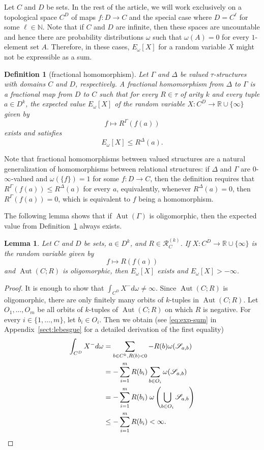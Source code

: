 \documentclass[nonacm]{acmart}
\newcommand{\N}{\mathbb N}
\DeclareMathOperator{\Aut}{Aut}
\newtheorem{definition}[theorem]{Definition}
\newtheorem{lemma}[theorem]{Lemma}
\begin{document}
Let $C$ and $D$ be sets. In the rest of the article, we will work exclusively on a topological space $C^D$ of maps $f \colon D \rightarrow C$ and the special case where $D = C^\ell$ 
for some $\ell \in \N$.
Note that if $C$ and $D$ are infinite, then these spaces are uncountable and hence there are probability distributions $\omega$ such that $\omega(A)=0$ for every $1$-element set $A$. Therefore, in these cases, $E_\omega[X]$ for a random variable $X$ might not be expressible as a sum.

\begin{definition}[fractional homomorphism]\label{def:frac-hom}
Let $\Gamma$ and $\Delta$ be valued $\tau$-structures with domains $C$ and $D$, respectively. A \emph{fractional homomorphism} from
$\Delta$ to $\Gamma$ is a 
fractional map from $D$ to $C$
 such that for every $R \in \tau$ of arity $k$ 
and every tuple $a \in D^k$,
the expected value $E_\omega[X]$
of the random variable $X \colon C^D \rightarrow \mathbb{R}\cup\{\infty\}$ given  by
\[f \mapsto R^{\Gamma}(f(a))\] 
exists and satisfies 
$$E_\omega[X]
\leq R^{\Delta}(a).$$
\end{definition}
Note that fractional homomorphisms between valued structures are a natural generalization of homomorphisms between relational structures: if $\Delta$ and $\Gamma$ are $0$-$\infty$-valued and $\omega(\{f\}) = 1$ for some $f \colon D \to C$, then the definition requires that $R^\Gamma(f(a)) \leq R^\Delta(a)$ for every $a$, equivalently, whenever $R^\Delta(a)=0$, then $R^\Gamma(f(a))=0$, which is equivalent to $f$ being a homomorphism.

The following lemma shows that if $\Aut(\Gamma)$ is oligomorphic, then the expected value from Definition~\ref{def:frac-hom} always exists. 
\begin{lemma}\label{lem:E-exists}
Let $C$ and $D$ be sets, $a \in D^k$, and $R \in {\mathscr R}_C^{(k)}$.
If $X \colon C^D \rightarrow \mathbb{R}\cup\{\infty\}$ is the random variable given by
\[f \mapsto R(f(a))\]
and $\Aut(C; R)$ is oligomorphic, then $E_\omega[X]$ exists and $E_\omega[X] > -\infty$.
\end{lemma}
\begin{proof}
It is enough to show that $\int_{C^D} X^- d \omega \neq \infty$. Since $\Aut(C;R)$ is oligomorphic, there are only finitely many orbits of $k$-tuples in $\Aut(C;R)$. Let $O_1, \dots, O_m$ be all orbits of $k$-tuples of $\Aut(C; R)$ on which $R$ is negative. For every $i \in \{1, \dots, m\}$, let $b_i \in O_i$.
Then we obtain (see \eqref{eq:exp-sum} in Appendix~\ref{sect:lebesgue} for a detailed derivation of the first equality)
\begin{align*}
   \int_{C^D} X^- d \omega & =  \sum_{b \in C^k,R(b) < 0} -R(b) \omega({\mathscr S}_{a,b}) \\
   & = - \sum_{i=1}^m R(b_i) \sum_{b \in O_i} \omega({\mathscr S}_{a,b}) \\
   &= - \sum_{i=1}^m R(b_i) \; \omega \left( \bigcup_{b \in O_i}{\mathscr S}_{a,b} \right) \\
   & \leq -\sum_{i=1}^m R(b_i) < \infty.\qedhere 
\end{align*} 
\end{proof}
\end{document}
